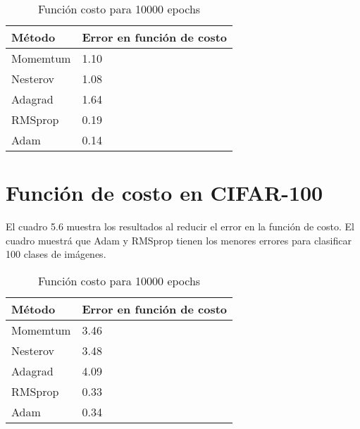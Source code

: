 \begin{table}[H]
	\centering
	\caption{Función costo para 10000 epochs}
	\label{my-label}
	\begin{centering}
		\begin{tabular}{@{}ll@{}}
			\toprule
			Método& Error en función de costo\\ \midrule
			Momemtum& 1.10 \\
			Nesterov& 1.08\\
			Adagrad&1.64   \\
			RMSprop& 0.19 \\
			Adam& 0.14 \\ 
		\end{tabular}
	\end{centering}
	
\end{table}
\vspace{4cm}
\section{Función de costo en CIFAR-100	}
El cuadro 5.6 muestra los resultados al reducir el error en la función de costo. El cuadro muestrá que Adam y RMSprop tienen los menores errores para clasificar 100 clases de imágenes.
\begin{table}[H]
	\centering
	\caption{Función costo para 10000 epochs}
	\label{my-label}
	\begin{centering}
		\begin{tabular}{@{}ll@{}}
			\toprule
			Método& Error en función de costo\\ \midrule
			Momemtum& 3.46 \\
			Nesterov& 3.48\\
			Adagrad&4.09  \\
			RMSprop& 0.33 \\
			Adam& 0.34 \\ 
		\end{tabular}
	\end{centering}
	
\end{table}